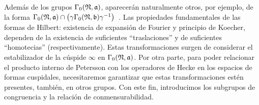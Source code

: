 Adem\'{a}s de los grupos $\Gamma_{0}(\frak{N},\frak{a})$, aparecer\'{a}n
naturalmente otros, por ejemplo, de la forma
\begin{math}
	\Gamma_{0}(\frak{N},\frak{a})\cap
		\big(\gamma\Gamma_{0}(\frak{N},\frak{b})\gamma^{-1}\big)
\end{math}~.
Las propiedades fundamentales de las formas de Hilbert: existencia
de expansi\'{o}n de Fourier y principio de Koecher, dependen de la existencia
de suficientes ``traslaciones'' y de suficientes ``homotecias''
(respectivamente). Estas transformaciones surgen de considerar el estabilizador
de la c\'{u}spide $\infty$ en $\Gamma_{0}(\frak{N},\frak{a})$. Por otra
parte, para poder relacionar el producto interno de Petersson con los
operadores de Hecke en los espacios de formas cuspidales, necesitaremos
garantizar que estas transformaciones est\'{e}n presentes, tambi\'{e}n, en
otros grupos. Con este fin, introducimos los subgrupos de congruencia y la
relaci\'{o}n de conmensurabilidad.

